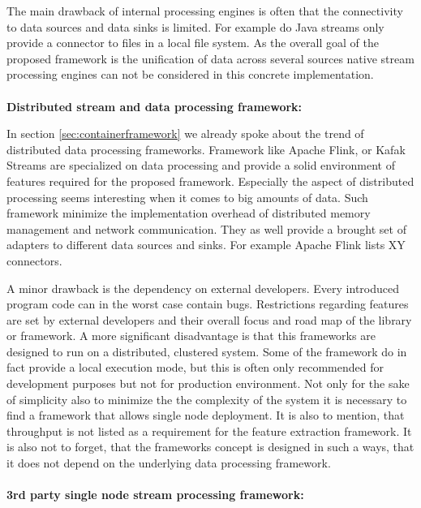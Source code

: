 The main drawback of internal processing engines is often that the connectivity to data sources and data sinks is limited. For example do Java streams only provide a connector to files in a local file system. As the overall goal of the proposed framework is the unification of data across several sources native stream processing engines can not be considered in this concrete implementation.
\\\\
\textbf{Distributed stream and data processing framework:}

\noindent In section \ref{sec:containerframework} we already spoke about the trend of distributed data processing frameworks. Framework like Apache Flink, or Kafak Streams are specialized on data processing and provide a solid environment of features required for the proposed framework. Especially the aspect of distributed processing seems interesting when it comes to big amounts of data. Such framework minimize the implementation overhead of distributed memory management and network communication. They as well provide a brought set of adapters to different data sources and sinks. For example Apache Flink lists XY connectors. 

A minor drawback is the dependency on external developers. Every introduced program code can in the worst case contain bugs. Restrictions regarding features are set by external developers and their overall focus and road map of the library or framework. A more significant disadvantage is that this frameworks are designed to run on a distributed, clustered system. Some of the framework do in fact provide a local execution mode, but this is often only recommended for development purposes but not for production environment. Not only for the sake of simplicity also to minimize the the complexity of the system it is necessary to find a framework that allows single node deployment. It is also to mention, that throughput is not listed as a requirement for the feature extraction framework. It is also not to forget, that the frameworks concept is designed in such a ways, that it does not depend on the underlying data processing framework.
\\\\

\textbf{3rd party single node stream processing framework:}

